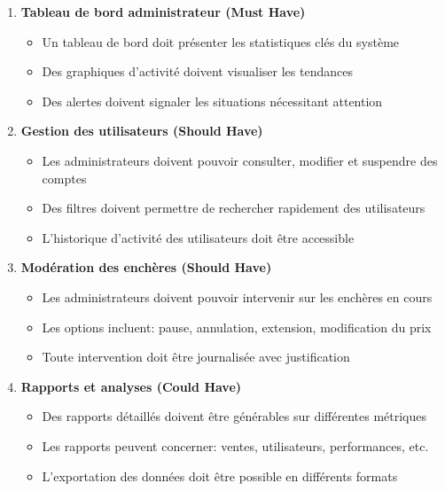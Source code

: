\begin{enumerate}
    \item \textbf{Tableau de bord administrateur (Must Have)}
    \begin{itemize}
        \item Un tableau de bord doit présenter les statistiques clés du système
        \item Des graphiques d'activité doivent visualiser les tendances
        \item Des alertes doivent signaler les situations nécessitant attention
    \end{itemize}
    
    \item \textbf{Gestion des utilisateurs (Should Have)}
    \begin{itemize}
        \item Les administrateurs doivent pouvoir consulter, modifier et suspendre des comptes
        \item Des filtres doivent permettre de rechercher rapidement des utilisateurs
        \item L'historique d'activité des utilisateurs doit être accessible
    \end{itemize}
    
    \item \textbf{Modération des enchères (Should Have)}
    \begin{itemize}
        \item Les administrateurs doivent pouvoir intervenir sur les enchères en cours
        \item Les options incluent: pause, annulation, extension, modification du prix
        \item Toute intervention doit être journalisée avec justification
    \end{itemize}
    
    \item \textbf{Rapports et analyses (Could Have)}
    \begin{itemize}
        \item Des rapports détaillés doivent être générables sur différentes métriques
        \item Les rapports peuvent concerner: ventes, utilisateurs, performances, etc.
        \item L'exportation des données doit être possible en différents formats
    \end{itemize}
\end{enumerate}

